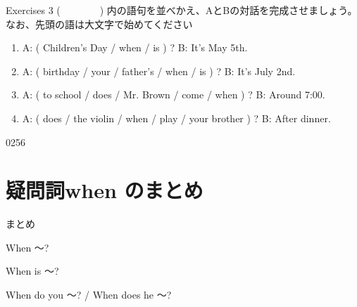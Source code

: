 \documentclass[aspectratio=169,xcolor={dvipsnames,table}]{beamer}
\begin{document}
\begin{frame}[plain]{Exercises 3}
 (~~~~~~~~) 内の語句を並べかえ、AとBの対話を完成させましょう。なお、先頭の語は大文字で始めてください

\begin{enumerate}
 \item A: ( Children's Day / when / is ) ? 
\hspace{137.4pt}B: It's May 5th.\\
\phantom{A: }
 \item A: ( birthday / your / father's / when / is ) ?
\hspace{83.5pt}B: It's July 2nd.\\
\phantom{A: }
 \item A: ( to school / does / Mr. Brown / come / when ) ?
\hspace{47pt}B: Around 7:00.\\
\phantom{A: }
 \item A: ( does / the violin / when / play / your brother ) ?
\hspace{39.7pt}B: After dinner.\\
\phantom{A: }
\end{enumerate}

\mbox{}\hfill{\tiny 0256}\,{\scriptsize {}}

\end{frame}
\section{疑問詞when  のまとめ}
\begin{frame}[plain]{まとめ}
 \begin{block}{When ～? }
\begin{description}[　　　　]
 \item[be動詞] When is ～?
 \item[一般動詞] When do you ～? / When does he ～?
\end{description}
  
 \end{block}
\end{frame}
\end{document}
